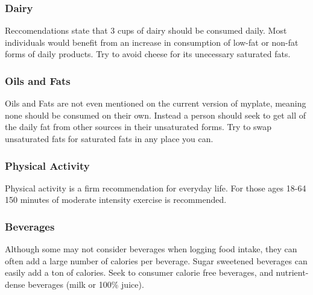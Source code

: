 \documentclass[letterpaper, 11pt]{article}
\begin{document}
\subsubsection{Dairy}
\label{sec:orgf21f5df}
Reccomendations state that 3 cups of dairy should be consumed daily. Most individuals would benefit from an increase in consumption of low-fat or non-fat forms of daily products. Try to avoid cheese for its unecessary saturated fats.\\
\subsubsection{Oils and Fats}
\label{sec:org107e75a}
Oils and Fats are not even mentioned on the current version of myplate, meaning none should be consumed on their own. Instead a person should seek to get all of the daily fat from other sources in their unsaturated forms. Try to swap unsaturated fats for saturated fats in any place you can.\\
\subsubsection{Physical Activity}
\label{sec:orgb141b65}
Physical activity is a firm recommendation for everyday life. For those ages 18-64 150 minutes of moderate intensity exercise is recommended.\\
\subsubsection{Beverages}
\label{sec:org58c4c44}
Although some may not consider beverages when logging food intake, they can often add a large number of calories per beverage. Sugar sweetened beverages can easily add a ton of calories. Seek to consumer calorie free beverages, and nutrient-dense beverages (milk or 100\% juice).\\
\end{document}
